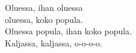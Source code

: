 
            Oluessa, ihan oluessa \\
            oluessa, koko popula. \\
            Oluessa popula, ihan koko popula. \\
            Kaljassa, kaljassa, o-o-o-o. \\
